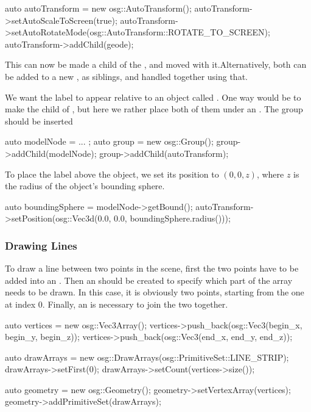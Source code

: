 \begin{cpp}
auto autoTransform = new osg::AutoTransform();
autoTransform->setAutoScaleToScreen(true);
autoTransform->setAutoRotateMode(osg::AutoTransform::ROTATE_TO_SCREEN);
autoTransform->addChild(geode);
\end{cpp}

This  can now be made a child of the ,
and moved with it.Alternatively, both can be added to a new ,
as siblings, and handled together using that.

We want the label to appear relative to an object called .
One way would be to make  the child of ,
but here we rather place both of them under an . The group should
be inserted

\begin{cpp}
auto modelNode = ... ;
auto group = new osg::Group();
group->addChild(modelNode);
group->addChild(autoTransform);
\end{cpp}

To place the label above the object, we set its position to $(0,0,z)$, where $z$
is the radius of the object's bounding sphere.

\begin{cpp}
auto boundingSphere = modelNode->getBound();
autoTransform->setPosition(osg::Vec3d(0.0, 0.0, boundingSphere.radius()));
\end{cpp}



\subsubsection{Drawing Lines}

To draw a line between two points in the scene, first the two points
have to be added into an . Then an 
should be created to specify which part of the array needs to be drawn.
In this case, it is obviously two points, starting from the one at index 0.
Finally, an  is necessary to join the two together.

\begin{cpp}
auto vertices = new osg::Vec3Array();
vertices->push_back(osg::Vec3(begin_x, begin_y, begin_z));
vertices->push_back(osg::Vec3(end_x, end_y, end_z));

auto drawArrays = new osg::DrawArrays(osg::PrimitiveSet::LINE_STRIP);
drawArrays->setFirst(0);
drawArrays->setCount(vertices->size());

auto geometry = new osg::Geometry();
geometry->setVertexArray(vertices);
geometry->addPrimitiveSet(drawArrays);
\end{cpp}


